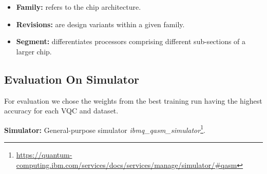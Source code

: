 \begin{itemize}
    \item \textbf{Family:} refers to the chip architecture. 
    \item \textbf{Revisions:} are design variants within a given family. 
    \item \textbf{Segment:} differentiates processors comprising different sub-sections of a larger chip.
\end{itemize}


\subsection{Evaluation On Simulator}
For evaluation we chose the weights from the best training run having the highest accuracy for each VQC and dataset. 

\textbf{Simulator:} General-purpose simulator \textit{ibmq\_qasm\_simulator}\footnote{\url{https://quantum-computing.ibm.com/services/docs/services/manage/simulator/#qasm}}.

